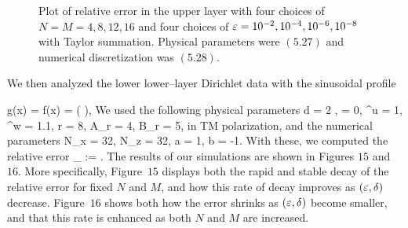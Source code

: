 \begin{figure}[H]
\vspace{3mm}
\caption{Plot of relative error in the upper layer with four choices of $N = M = 4, 8, 12, 16$
    and four choices of $\varepsilon = 10^{-2}, 10^{-4}, 10^{-6}, 10^{-8}$
    with Taylor summation.
    Physical parameters were $(5.27)$ and numerical
    discretization was $(5.28)$.}
\label{Fig:Eps}
\end{figure}
\begin{flushleft}
\vspace{-20mm}
We then analyzed the lower lower--layer Dirichlet
data with the sinusoidal profile
\end{flushleft}
\be
\label{Eqn:Params:Geom:Lower}
g(x) = \Eps f(x) = \Eps \left(  \right),
\ee
We used the following physical parameters
\be
d = 2 \pi,
\quad
\alpha = 0,
\quad
\epsilon^u = 1,
\quad
\epsilon^w = 1.1,
\quad
r = 8,
\quad
A_r = 4,
\quad
B_r = 5,
\label{Eqn:Params:Phys:Lower}
\ee
in TM polarization, and the numerical parameters
\be
\label{Eqn:Params:Num:Lower}
N_x = 32,
\quad
N_z = 32,
\quad
a = 1,
\quad
b = -1.
\ee
With these, we computed the relative error
\bes
{}_{} :=
  {}.
\ees
The results of our simulations are shown in 
Figures $15$ and $16$. More specifically,
Figure~$15$ displays both the rapid and stable decay of the 
relative error for fixed $N$ and $M$, and how this rate of decay
improves as $(\varepsilon,\delta)$ decrease. Figure~$16$ shows
both how the error shrinks as $(\varepsilon,\delta)$ become smaller, and that
this rate is enhanced as both $N$ and $M$ are increased.


